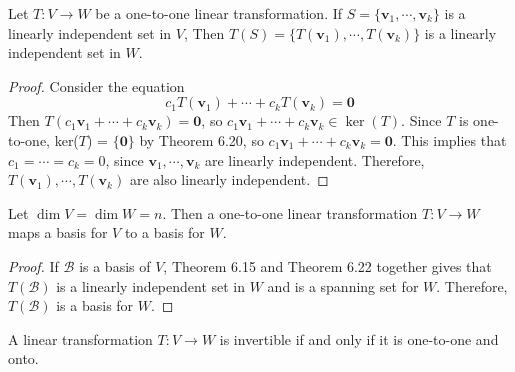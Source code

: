 \begin{theorem}
	Let $T: V \rightarrow W$ be a one-to-one linear transformation. If $S = \{ \textbf{v}_1, \cdots, \textbf{v}_k \}$ is a linearly independent set in $V$, Then $T(S) = \{ T(\textbf{v}_1), \cdots, T(\textbf{v}_k) \}$ is a linearly independent set in $W$.
\end{theorem}
\begin{proof}
	Consider the equation \begin{equation*}
		c_1T(\textbf{v}_1) + \cdots + c_kT(\textbf{v}_k) = \textbf{0}
	\end{equation*} Then $T(c_1\textbf{v}_1 + \cdots + c_k\textbf{v}_k) = \textbf{0}$, so $c_1\textbf{v}_1 + \cdots + c_k\textbf{v}_k \in \ker(T)$. Since $T$ is one-to-one, ker($T$) = $\{\textbf{0}\}$ by Theorem 6.20, so $c_1\textbf{v}_1 + \cdots + c_k\textbf{v}_k = \textbf{0}$. This implies that $c_1 = \cdots = c_k = 0$, since $\textbf{v}_1, \cdots, \textbf{v}_k$ are linearly independent. Therefore, $T(\textbf{v}_1), \cdots, T(\textbf{v}_k)$ are also linearly independent.
\end{proof}

\begin{corollary}
	Let $\dim V = \dim W = n$. Then a one-to-one linear transformation $T: V \rightarrow W$ maps a basis for $V$ to a basis for $W$.
\end{corollary}

\begin{proof}
	If $\mathcal{B}$ is a basis of $V$, Theorem 6.15 and Theorem 6.22 together gives that $T(\mathcal{B})$ is a linearly independent set in $W$ and is a spanning set for $W$. Therefore, $T(\mathcal{B})$ is a basis for $W$.
\end{proof}

\begin{theorem}
	A linear transformation $T: V \rightarrow W$ is invertible if and only if it is one-to-one and onto.
\end{theorem}

